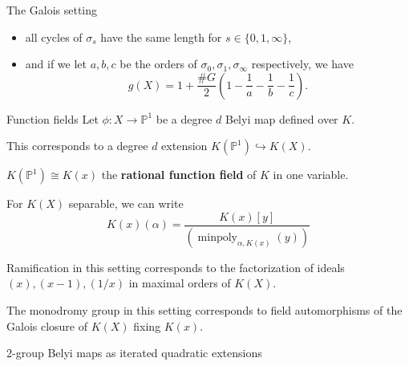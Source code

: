 \documentclass[handout,xcolor=dvipsnames]{beamer}
\theoremstyle{plain}
\newcommand{\PP}{\mathbb P}
\DeclareMathOperator{\minpoly}{minpoly}
\begin{document}
{\begin{frame}{The Galois setting}
\begin{itemize}
        \item
          all cycles of $\sigma_s$ have the same
          length for $s\in\{0,1,\infty\}$,
        \item
          and if we let $a,b,c$ be the orders
          of $\sigma_0,\sigma_1,\sigma_\infty$
          respectively,
          we have
          \[
            g(X) = 1+\frac{\#G}{2}
            \left(
              1-\frac{1}{a}
              -\frac{1}{b}
              -\frac{1}{c}
            \right).
          \]
      \end{itemize}
    \end{frame}
    \begin{frame}{Function fields}
      Let $\phi\colon X\to\PP^1$ be
      a degree $d$ Belyi map defined over $K$.
      \pause\par
      This corresponds to a degree $d$
      extension
      $K(\PP^1)\hookrightarrow K(X)$.
      \pause\par
      $K(\PP^1)\cong K(x)$
      the
      \textbf{rational function field}
      of $K$ in one variable.
      \pause\par
      For
      $K(X)$ separable,
      we can write
      \[
        K(x)(\alpha) = \frac{K(x)[y]}{(\minpoly_{\alpha,K(x)}(y))}
      \]
      \pause\par
      Ramification in this setting corresponds
      to the factorization of ideals
      $(x),(x-1),(1/x)$
      in maximal orders of $K(X)$.
      \pause\par
      The monodromy group in this setting
      corresponds to field automorphisms
      of the Galois closure of $K(X)$
      fixing $K(x)$.
    \end{frame}
    \begin{frame}[fragile]{$2$-group Belyi maps as iterated quadratic extensions}
      \begin{center}
\end{center}
\end{frame}}
\end{document}
